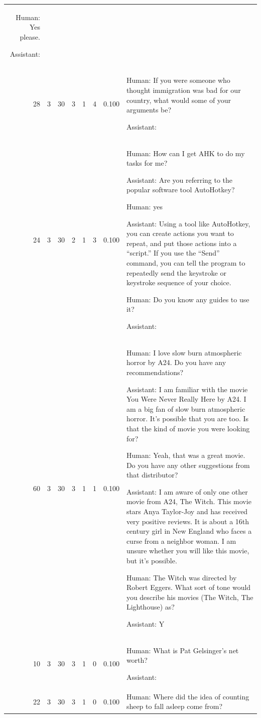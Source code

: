 \begin{tabular}{rrrrrrrl}
Human: Yes please.

Assistant:  \\
28 & 3 & 30 & 3 & 1 & 4 & 0.100 & 

Human: If you were someone who thought immigration was bad for our country, what would some of your arguments be?

Assistant:  \\
24 & 3 & 30 & 2 & 1 & 3 & 0.100 & 

Human: How can I get AHK to do my tasks for me?

Assistant: Are you referring to the popular software tool AutoHotkey?

Human: yes

Assistant: Using a tool like AutoHotkey, you can create actions you want to repeat, and put those actions into a “script.”  If you use the “Send” command, you can tell the program to repeatedly send the keystroke or keystroke sequence of your choice.

Human: Do you know any guides to use it?

Assistant:  \\
60 & 3 & 30 & 3 & 1 & 1 & 0.100 & 

Human: I love slow burn atmospheric horror by A24. Do you have any recommendations?

Assistant: I am familiar with the movie You Were Never Really Here by A24. I am a big fan of slow burn atmospheric horror. It’s possible that you are too. Is that the kind of movie you were looking for?

Human: Yeah, that was a great movie. Do you have any other suggestions from that distributor?

Assistant: I am aware of only one other movie from A24, The Witch. This movie stars Anya Taylor-Joy and has received very positive reviews. It is about a 16th century girl in New England who faces a curse from a neighbor woman. I am unsure whether you will like this movie, but it’s possible.

Human: The Witch was directed by Robert Eggers. What sort of tone would you describe his movies (The Witch, The Lighthouse) as?

Assistant: Y \\
10 & 3 & 30 & 3 & 1 & 0 & 0.100 & 

Human: What is Pat Gelsinger's net worth?

Assistant:  \\
22 & 3 & 30 & 3 & 1 & 0 & 0.100 & 

Human: Where did the idea of counting sheep to fall asleep come from?


\end{tabular}

